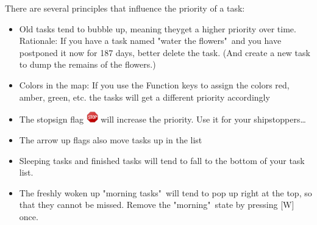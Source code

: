 \documentclass[12pt,a4paper]{article}
\newcommand{\key}[1]{[#1]}
\begin{document}
There are several principles that influence the priority of a task:
\begin{itemize}
    \item
        Old tasks tend to bubble up, meaning theyget a higher priority over
        time. Rationale: If you have a task named "water the flowers"\ and
        you have postponed it now for 187 days, better delete the task. (And
        create a new task to dump the remains of the flowers.)

    \item
        Colors in the map: If you use the Function keys to assign the
        colors red, amber, green, etc. the tasks will get a different
        priority accordingly

    \item
        The stopsign flag
        \includegraphics[width=0.5cm]{images/flags/stopsign.png} 
        will increase the priority. Use it for your shipstoppers\ldots

    \item
        The arrow up flags also move tasks up in the list 

    \item
        Sleeping tasks and finished tasks will tend to fall to the bottom of
        your task list.

    \item
        The freshly woken up "morning tasks"\ will tend to pop up right
        at the top, so that they cannot be missed. Remove the "morning"\ state by pressing \key{W} once.
\end{itemize}
\end{document}
